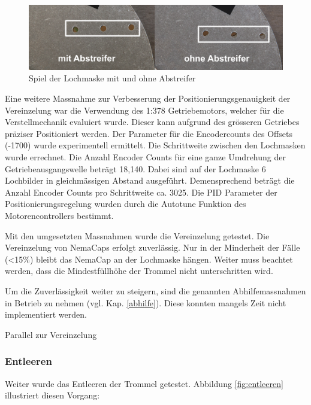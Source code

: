 \begin{figure}[H]
	\includegraphics[draft=false,width=1\textwidth]{Illustrationen/7-Inbetriebnahme_und_Kalibration/spiel_lochmaske_1.jpg}
	\caption{Spiel der Lochmaske mit und ohne Abstreifer}
	\label{fig:spiel_lochmaske}
\end{figure}

Eine weitere Massnahme zur Verbesserung der Positionierungsgenauigkeit der Vereinzelung war die Verwendung des 1:378 Getriebemotors, welcher für die Verstellmechanik evaluiert wurde. Dieser kann aufgrund des grösseren Getriebes präziser Positioniert werden. Der Parameter für die Encodercounts des Offsets (-1700) wurde experimentell ermittelt. Die Schrittweite zwischen den Lochmasken wurde errechnet. Die Anzahl Encoder Counts für eine ganze Umdrehung der Getriebeausgangswelle beträgt 18,140. Dabei sind auf der Lochmaske 6 Lochbilder in gleichmässigen Abstand ausgeführt. Demensprechend beträgt die Anzahl Encoder Counts pro Schrittweite ca. 3025. Die PID Parameter der Positionierungsregelung wurden durch die Autotune Funktion des Motorencontrollers bestimmt.
\newline

Mit den umgesetzten Massnahmen wurde die Vereinzelung getestet. Die Vereinzelung von NemaCaps erfolgt zuverlässig. Nur in der Minderheit der Fälle (<15\%) bleibt das NemaCap an der Lochmaske hängen. Weiter muss beachtet werden, dass die Mindestfüllhöhe der Trommel nicht unterschritten wird.
\newline

Um die Zuverlässigkeit weiter zu steigern, sind die genannten Abhilfemassnahmen in Betrieb zu nehmen (vgl. Kap. \ref{abhilfe}). Diese konnten mangels Zeit nicht implementiert werden.
\newline

Parallel zur Vereinzelung 
\subsubsection{Entleeren}
Weiter wurde das Entleeren der Trommel getestet. Abbildung \ref{fig:entleeren} illustriert diesen Vorgang:

